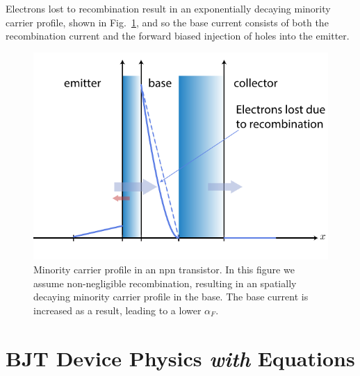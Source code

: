 Electrons lost to recombination result in an exponentially decaying minority carrier profile, shown in Fig.~\ref{fig:slide12_alpha_f}, and so the base current consists of both the recombination current and the forward biased  injection of holes into the emitter. 
\begin{figure}[tb]
\begin{center}
\includegraphics[width=.75\columnwidth]{slide12_alpha_f}
\end{center}
\caption{Minority carrier profile in an npn transistor.  In this figure we assume non-negligible recombination, resulting in an spatially decaying minority carrier profile in the base.  The base current is increased as a result, leading to a lower $\alpha_F$.}
\label{fig:slide12_alpha_f}
\end{figure}
\section{BJT Device Physics \emph{with} Equations}
